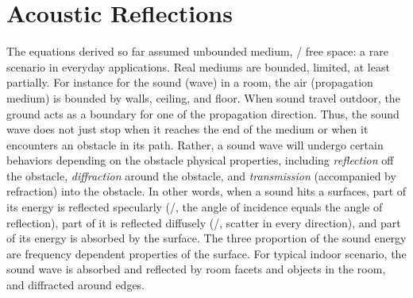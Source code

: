 

\section{Acoustic Reflections}


The equations derived so far assumed unbounded medium, \ie/ free space: a rare scenario in everyday applications.
Real mediums are bounded, limited, at least partially.
For instance for the sound (wave) in a room, the air (propagation medium) is bounded by walls, ceiling, and floor.
When sound travel outdoor, the ground acts as a boundary for one of the propagation direction.
Thus, the sound wave does not just stop when it reaches the end of the medium or when it encounters an obstacle in its path.
Rather, a sound wave will undergo certain behaviors depending on the obstacle physical properties, including
\textit{reflection} off the obstacle, \textit{diffraction} around the obstacle, and \textit{transmission} (accompanied by refraction) into the obstacle.
In other words, when a sound hits a surfaces,
part of its energy is reflected specularly (\ie/, the angle of incidence equals the angle of reflection),
part of it is reflected diffusely (\ie/, scatter in every direction),
and part of its energy is absorbed by the surface.
The three proportion of the sound energy are frequency dependent properties of the surface.
For typical indoor scenario, the sound wave is absorbed and reflected by room facets and objects in the room, and diffracted around edges.


